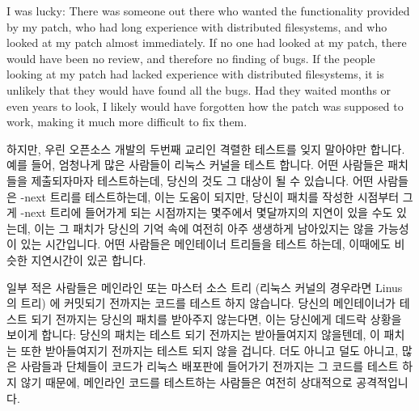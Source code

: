 I was lucky:  There was someone out there who wanted the functionality
provided by my patch, who had long experience with distributed filesystems,
and who looked at my patch almost immediately.
If no one had looked at my patch, there would have been no review, and
therefore no finding of bugs.
If the people looking at my patch had lacked experience with distributed
filesystems, it is unlikely that they would have found all the bugs.
Had they waited months or even years to look, I likely would have forgotten
how the patch was supposed to work, making it much more difficult to
fix them.
\fi

하지만, 우린 오픈소스 개발의 두번째 교리인 격렬한 테스트를 잊지 말아야만
합니다.
예를 들어, 엄청나게 많은 사람들이 리눅스 커널을 테스트 합니다.
어떤 사람들은 패치들을 제출되자마자 테스트하는데, 당신의 것도 그 대상이 될 수
있습니다.
어떤 사람들은 -next 트리를 테스트하는데, 이는 도움이 되지만, 당신이 패치를
작성한 시점부터 그게 -next 트리에 들어가게 되는 시점까지는 몇주에서 몇달까지의
지연이 있을 수도 있는데, 이는 그 패치가 당신의 기억 속에 여전히 아주 생생하게
남아있지는 않을 가능성이 있는 시간입니다.
어떤 사람들은 메인테이너 트리들을 테스트 하는데, 이때에도 비슷한 지연시간이
있곤 합니다.

일부 적은 사람들은 메인라인 또는 마스터 소스 트리 (리눅스 커널의 경우라면 Linus
의 트리) 에 커밋되기 전까지는 코드를 테스트 하지 않습니다.
당신의 메인테이너가 테스트 되기 전까지는 당신의 패치를 받아주지 않는다면, 이는
당신에게 데드락 상황을 보이게 합니다: 당신의 패치는 테스트 되기 전까지는
받아들여지지 않을텐데, 이 패치는 또한 받아들여지기 전까지는 테스트 되지 않을
겁니다.
더도 아니고 덜도 아니고, 많은 사람들과 단체들이 코드가 리눅스 배포판에 들어가기
전까지는 그 코드를 테스트 하지 않기 때문에, 메인라인 코드를 테스트하는 사람들은
여전히 상대적으로 공격적입니다.


